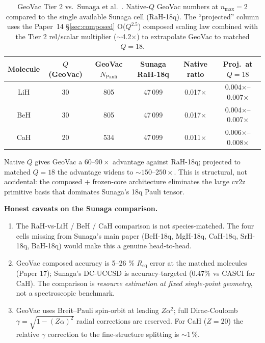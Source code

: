 \documentclass[aps,pra,twocolumn,superscriptaddress,longbibliography]{revtex4-2}
\begin{document}
\begin{table}[h]
\caption{GeoVac Tier 2 vs.\ Sunaga et al.~\cite{Sunaga2025}. Native-$Q$
GeoVac numbers at $n_{\max}=2$ compared to the single available
Sunaga cell (RaH-18q). The ``projected'' column uses the
Paper~14 \S\ref{sec:composed} O($Q^{2.5}$) composed scaling
law combined with the Tier 2 rel/scalar multiplier ($\sim$4.2$\times$)
to extrapolate GeoVac to matched $Q = 18$.}
\label{tab:sunaga}
\begin{ruledtabular}
\begin{tabular}{cccccc}
Molecule & $Q$ (GeoVac) & GeoVac $N_{\mathrm{Pauli}}$ & Sunaga RaH-18q & Native ratio & Proj.\ at $Q=18$ \\
\hline
LiH & 30 & 805 & 47\,099 & 0.017$\times$ & 0.004$\times$--0.007$\times$ \\
BeH & 30 & 805 & 47\,099 & 0.017$\times$ & 0.004$\times$--0.007$\times$ \\
CaH & 20 & 534 & 47\,099 & 0.011$\times$ & 0.006$\times$--0.008$\times$ \\
\end{tabular}
\end{ruledtabular}
\end{table}

Native $Q$ gives GeoVac a $60$--$90\times$ advantage against RaH-18q;
projected to matched $Q = 18$ the advantage widens to
$\sim 150$--$250\times$. This is structural, not accidental: the
composed + frozen-core architecture eliminates the large cv2z
primitive basis that dominates Sunaga's 18q Pauli tensor.

\textbf{Honest caveats on the Sunaga comparison.}
\begin{enumerate}
  \item The RaH-vs-LiH / BeH / CaH comparison is not species-matched.
    The four cells missing from Sunaga's main paper (BeH-18q,
    MgH-18q, CaH-18q, SrH-18q, BaH-18q) would make this a genuine
    head-to-head.
  \item GeoVac composed accuracy is 5--26 \% $R_{\mathrm{eq}}$ error
    at the matched molecules (Paper 17); Sunaga's DC-UCCSD is
    accuracy-targeted ($0.47\%$ vs CASCI for CaH). The comparison
    is \emph{resource estimation at fixed single-point geometry},
    not a spectroscopic benchmark.
  \item GeoVac uses Breit--Pauli spin-orbit at leading $Z\alpha^2$;
    full Dirac-Coulomb $\gamma = \sqrt{1-(Z\alpha)^2}$ radial
    corrections are reserved. For CaH ($Z=20$) the relative
    $\gamma$ correction to the fine-structure splitting is
    $\sim 1\,\%$.
\end{enumerate}
\end{document}
